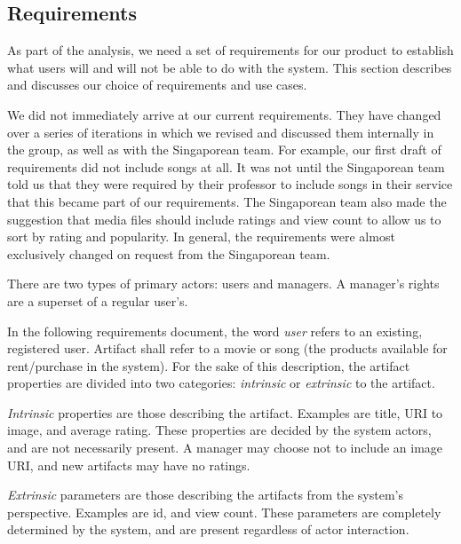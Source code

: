 \subsection{Requirements}
\label{sec:requirements}
As part of the analysis, we need a set of requirements for our product to
establish what users will and will not be able to do with the system. This
section describes and discusses our choice of requirements and use cases.

We did not immediately arrive at our current requirements. They have changed
over a series of iterations in which we revised and discussed them internally in
the group, as well as with the Singaporean team. For example, our first draft of
requirements did not include songs at all. It was not until the Singaporean team
told us that they were required by their professor to include songs in their
service that this became part of our requirements. The Singaporean team also
made the suggestion that media files should include ratings and view count to allow us to
sort by rating and popularity. In general, the requirements were almost
exclusively changed on request from the Singaporean team.

There are two types of primary actors: users and managers. A manager’s rights
are a superset of a regular user's. 

In the following requirements document, the word \emph{user} refers to an
existing, registered user. Artifact shall refer to a movie or song (the
products available for rent/purchase in the system). For the sake of this
description, the artifact properties are divided into two categories:
\emph{intrinsic} or \emph{extrinsic} to the artifact.

\emph{Intrinsic}
properties are those describing the artifact. Examples are title, URI to image,
and average rating. These properties are decided by the system actors, and are
not necessarily present. A manager may choose not to include an image URI, and
new artifacts may have no ratings.

\emph{Extrinsic} parameters are those
describing the artifacts from the system's perspective. Examples are id, and
view count. These parameters are completely determined by the system, and are
present regardless of actor interaction.

